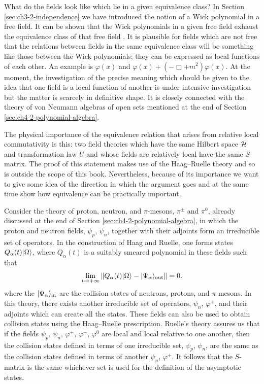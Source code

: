 What do the fields look like which lie in a given equivalence class? In
Section \ref{sec:ch3-2-independence} we have introduced the notion of a Wick polynomial in a free
field. It can be shown that the Wick polynomials in a given free field exhaust
the equivalence class of that free field \cite{ch4-27}. It is plausible for fields
which are not free that the relations between fields in the same equivalence
class will be something like those between the Wick polynomials; they can be
expressed as local functions of each other. An example is $\varphi(x)$ and
$\varphi(x)+(-\Box+m^2)\varphi(x)$. At the moment, the investigation of the
precise meaning which should be given to the idea that one field is a local
function of another is under intensive investigation but the matter is
scarcely in definitive shape. It is closely connected with the theory of von
Neumann algebras of open sets mentioned at the end of Section \ref{sec:ch4-2-polynomial-algebra}.

The physical importance of the equivalence relation that arises from relative
local commutativity is this: two field theories which have the same Hilbert
space $\mathcal{H}$ and transformation law $U$ and whose fields are relatively
local have the same $S$-matrix. The proof of this statement makes use of the
Haag--Ruelle theory and so is outside the scope of this book. Nevertheless,
because of its importance we want to give some idea of the direction in which
the argument goes and at the same time show how equivalence can be practically
important.

Consider the theory of proton, neutron, and $\pi$-mesons, $\pi^\pm$ and
$\pi^0$, already discussed at the end of Section \ref{sec:ch4-2-polynomial-algebra}, in which the proton and
neutron fields, $\psi_p$, $\psi_n$, together with their adjoints form an
irreducible set of operators. In the construction of Haag and Ruelle, one
forms states $Q_\alpha(t)\lvert \Omega\rangle$, where $Q_\alpha(t)$ is a suitably
smeared polynomial in these fields such that
\begin{equation*}
  \lim_{t\to+\infty}
  \left\lVert Q_\alpha(t)\lvert \Omega\rangle-\lvert \Psi_\alpha\rangle_{\mathrm{out}}\right\rVert=0.
\end{equation*}
where the $\lvert \Psi_\alpha\rangle_{\mathrm{in}}$ are the collision states of neutrons, protons,
and $\pi$ mesons. In this theory, there exists another irreducible set of
operators, $\psi_n$, $\varphi^+$, and their adjoints which can create all the
states. These fields can also be used to obtain collision states using the
Haag--Ruelle prescription. Ruelle's theory assures us that if the fields
$\psi_p$, $\psi_n$, $\varphi^+$, $\varphi^-$, $\varphi^0$ are local and local
relative to one another, then the collision states defined in terms of one
irreducible set, $\psi_p$, $\psi_n$, are the same as the collision states
defined in terms of another $\psi_n$, $\varphi^+$. It follows that the
$S$-matrix is the same whichever set is used for the definition of the
asymptotic states.

